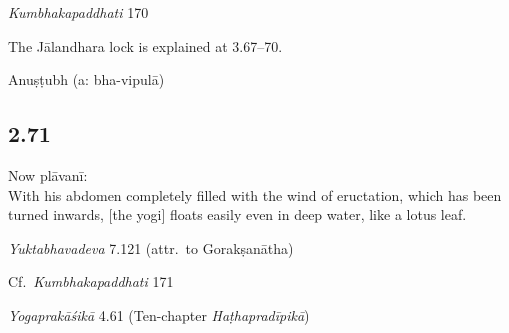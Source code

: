 \begin{ekdosis}
\begin{sources}[hp02_070]
\emph{Kumbhakapaddhati} 170

\begin{versinnote}
\end{versinnote}
\end{sources}

\begin{philcomm}[hp02_070]
The Jālandhara lock is explained at 3.67–70. 
\end{philcomm}

\begin{metre}[hp02_070]
Anuṣṭubh (a: bha-vipulā)
\end{metre}

\subsection*{2.71}
\begin{translation}[hp02_071]
Now plāvanī:\\
With his abdomen completely filled with the wind of eructation, which has been turned inwards, [the yogi] floats easily even in deep water, like a lotus leaf.
\end{translation}

\begin{testimonia}[hp02_071]

\emph{Yuktabhavadeva} 7.121 (attr.~to Gorakṣanātha)

\begin{versinnote}
\end{versinnote}

Cf.~\emph{Kumbhakapaddhati} 171

\begin{versinnote}
\end{versinnote}

\emph{Yogaprakāśikā} 4.61 (Ten-chapter \emph{Haṭhapradīpikā})


\end{testimonia}
\end{ekdosis}
